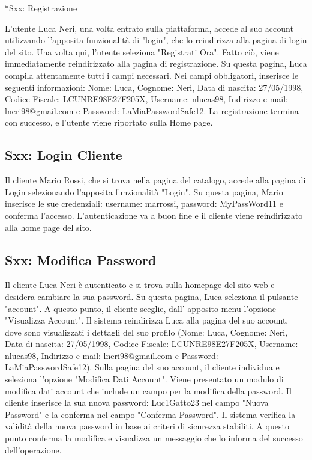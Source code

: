 \documentclass[12pt, a4paper, oneside]{book}
\begin{document}
    *{Sxx: Registrazione}
     L'utente Luca Neri, una volta entrato sulla piattaforma, accede al suo account utilizzando l'apposita funzionalità di "login", che lo
     reindirizza alla pagina di login del sito.
     Una volta qui, l'utente seleziona "Registrati Ora". Fatto ciò, viene immediatamente reindirizzato alla pagina di registrazione.
     Su questa pagina, Luca compila attentamente tutti i campi necessari. Nei campi obbligatori, inserisce le seguenti informazioni:
     Nome: Luca, Cognome: Neri, Data di nascita: 27/05/1998, Codice Fiscale: LCUNRE98E27F205X,
     Username: nlucas98, Indirizzo e-mail: lneri98@gmail.com e Password: LaMiaPasswordSafe12.
     La registrazione termina con successo, e l’utente viene riportato sulla Home page.

    \subsection*{Sxx: Login Cliente}
    Il cliente Mario Rossi, che si trova nella pagina del catalogo, accede alla pagina di Login selezionando l'apposita funzionalità "Login".
    Su questa pagina, Mario inserisce le sue credenziali: username: marrossi, password: MyPassWord11 e conferma l'accesso.
    L'autenticazione va a buon fine e il cliente viene reindirizzato alla home page del sito.

    \subsection*{Sxx: Modifica Password}
    Il cliente Luca Neri è autenticato e si trova sulla homepage del sito web e desidera cambiare la sua password.
    Su questa pagina, Luca seleziona il pulsante "account".
    A questo punto, il cliente sceglie,  dall' apposito menu l'opzione "Visualizza Account".
    Il sistema reindirizza Luca alla pagina del suo account, dove sono visualizzati i dettagli del suo profilo
    (Nome: Luca, Cognome: Neri, Data di nascita: 27/05/1998, Codice Fiscale: LCUNRE98E27F205X, Username: nlucas98,
     Indirizzo e-mail: lneri98@gmail.com e Password:  LaMiaPasswordSafe12).
    Sulla pagina del suo account, il cliente individua e seleziona l'opzione "Modifica Dati Account".
    Viene presentato un modulo di modifica dati account che include un campo per la modifica della password.
    Il cliente inserisce la sua nuova password: Luc1Gatto23 nel campo "Nuova Password" e la conferma nel campo "Conferma Password".
    Il sistema verifica la validità della nuova password in base ai criteri di sicurezza stabiliti.
    A questo punto conferma la modifica e visualizza un messaggio che lo informa del successo dell'operazione.
\end{document}
